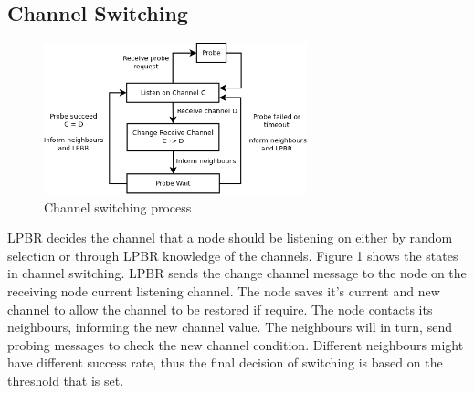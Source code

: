 
\subsection{Channel Switching}



\begin{figure}
\centering
\includegraphics[width=3in]{Diagram1}
\caption{Channel switching process}
\label{fig_sim}
\end{figure}

LPBR decides the channel that a node should be listening on either by random selection or through LPBR knowledge of the channels. Figure 1 shows the states in channel switching. LPBR sends the change channel message to the node on the receiving node current listening channel. The node saves it's current and new channel to allow the channel to be restored if require. The node contacts its neighbours, informing the new channel value. The neighbours will in turn, send probing messages to check the new channel condition. Different neighbours might have different success rate, thus the final decision of switching is based on the threshold that is set. 


